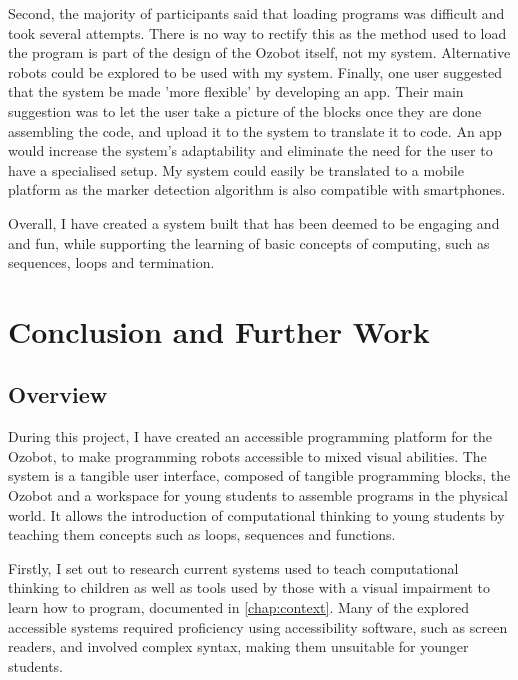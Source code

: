 \documentclass[oneside,%
                    author={Malak Hajji},
                    degree={BSc},
                    title={Designing An Accessible Ozobot Programming Platform for Students},
                  subtitle={With Mixed Visual Abilities}]{dissertation}
\begin{document}
Second, the majority of participants said that loading programs was difficult and took several attempts. There is no way to rectify this as the method used to load the program is part of the design of the Ozobot itself, not my system. Alternative robots could be explored to be used with my system.
Finally, one user suggested that the system be made 'more flexible' by developing an app. Their main suggestion was to let the user take a picture of the blocks once they are done assembling the code, and upload it to the system to translate it to code. An app would increase the system's adaptability and eliminate the need for the user to have a specialised setup. My system could easily be translated to a mobile platform as the marker detection algorithm is also compatible with smartphones. 

Overall, I have created a system built that has been deemed to be engaging and and fun, while supporting the learning of basic concepts of computing, such as sequences, loops and termination.



\chapter{Conclusion and Further Work}
\label{chap:conclusion}

\noindent
\section{Overview}
During this project, I have created an accessible programming platform for the Ozobot, to make programming robots accessible to mixed visual abilities. The system is a tangible user interface, composed of tangible programming blocks, the Ozobot and a workspace for young students to assemble programs in the physical world. It allows the introduction of computational thinking to young students by teaching them concepts such as loops, sequences and functions.


Firstly, I set out to research current systems used to teach computational thinking to children as well as tools used by those with a visual impairment to learn how to program, documented in \ref{chap:context}. Many of the explored accessible systems required proficiency using accessibility software, such as screen readers, and involved complex syntax, making them unsuitable for younger students. 
\end{document}
